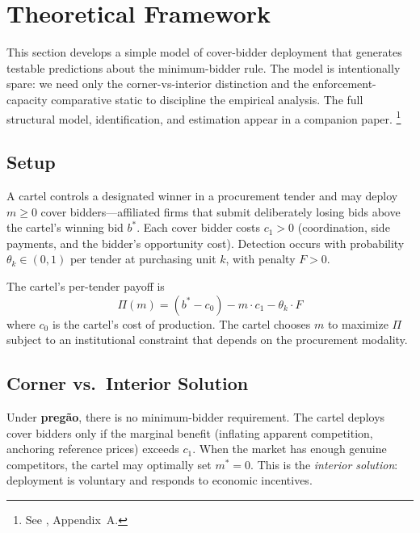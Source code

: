 \section{Theoretical Framework}
\label{sec:framework}

This section develops a simple model of cover-bidder deployment that
generates testable predictions about the minimum-bidder rule. The
model is intentionally spare: we need only the corner-vs-interior
distinction and the enforcement-capacity comparative static to
discipline the empirical analysis. The full structural model,
identification, and estimation appear in a companion paper.%
\footnote{See \citet{genicolomartins2026screening}, Appendix~A.}

\subsection{Setup}

A cartel controls a designated winner in a procurement tender and may
deploy $m \geq 0$ cover bidders---affiliated firms that submit
deliberately losing bids above the cartel's winning bid $b^*$. Each
cover bidder costs $c_1 > 0$ (coordination, side payments, and the
bidder's opportunity cost). Detection occurs with probability
$\theta_k \in (0,1)$ per tender at purchasing unit $k$, with
penalty $F > 0$.

The cartel's per-tender payoff is
\begin{equation}
  \Pi(m) = (b^* - c_0) - m \cdot c_1 - \theta_k \cdot F
  \label{eq:cartel_payoff}
\end{equation}
where $c_0$ is the cartel's cost of production. The cartel chooses
$m$ to maximize $\Pi$ subject to an institutional constraint that
depends on the procurement modality.

\subsection{Corner vs.\ Interior Solution}
\label{sec:corner_interior}

Under \textbf{preg\~ao}, there is no minimum-bidder requirement. The
cartel deploys cover bidders only if the marginal benefit (inflating
apparent competition, anchoring reference prices) exceeds $c_1$.
When the market has enough genuine competitors, the cartel may
optimally set $m^* = 0$. This is the \emph{interior solution}:
deployment is voluntary and responds to economic incentives.


